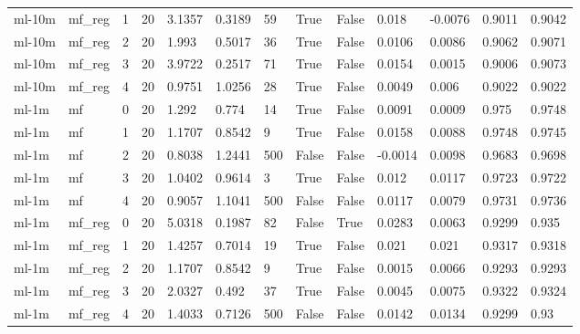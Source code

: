 \begin{table}[h]
\begin{tabular}{lllllllllllll}
ml-10m & mf\_reg & 1 & 20 & 3.1357 & 0.3189 & 59 & True & False & 0.018 & -0.0076 & 0.9011 & 0.9042 \\
ml-10m & mf\_reg & 2 & 20 & 1.993 & 0.5017 & 36 & True & False & 0.0106 & 0.0086 & 0.9062 & 0.9071 \\
ml-10m & mf\_reg & 3 & 20 & 3.9722 & 0.2517 & 71 & True & False & 0.0154 & 0.0015 & 0.9006 & 0.9073 \\
ml-10m & mf\_reg & 4 & 20 & 0.9751 & 1.0256 & 28 & True & False & 0.0049 & 0.006 & 0.9022 & 0.9022 \\
ml-1m & mf & 0 & 20 & 1.292 & 0.774 & 14 & True & False & 0.0091 & 0.0009 & 0.975 & 0.9748 \\
ml-1m & mf & 1 & 20 & 1.1707 & 0.8542 & 9 & True & False & 0.0158 & 0.0088 & 0.9748 & 0.9745 \\
ml-1m & mf & 2 & 20 & 0.8038 & 1.2441 & 500 & False & False & -0.0014 & 0.0098 & 0.9683 & 0.9698 \\
ml-1m & mf & 3 & 20 & 1.0402 & 0.9614 & 3 & True & False & 0.012 & 0.0117 & 0.9723 & 0.9722 \\
ml-1m & mf & 4 & 20 & 0.9057 & 1.1041 & 500 & False & False & 0.0117 & 0.0079 & 0.9731 & 0.9736 \\
ml-1m & mf\_reg & 0 & 20 & 5.0318 & 0.1987 & 82 & False & True & 0.0283 & 0.0063 & 0.9299 & 0.935 \\
ml-1m & mf\_reg & 1 & 20 & 1.4257 & 0.7014 & 19 & True & False & 0.021 & 0.021 & 0.9317 & 0.9318 \\
ml-1m & mf\_reg & 2 & 20 & 1.1707 & 0.8542 & 9 & True & False & 0.0015 & 0.0066 & 0.9293 & 0.9293 \\
ml-1m & mf\_reg & 3 & 20 & 2.0327 & 0.492 & 37 & True & False & 0.0045 & 0.0075 & 0.9322 & 0.9324 \\
ml-1m & mf\_reg & 4 & 20 & 1.4033 & 0.7126 & 500 & False & False & 0.0142 & 0.0134 & 0.9299 & 0.93 \\
\bottomrule
\end{tabular}
\end{table}
